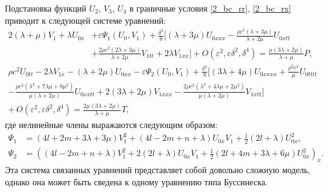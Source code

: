 \documentclass[12pt, a4paper]{article}
\begin{document}
Подстановка функций $ U_2 $, $ V_3 $, $ U_4 $ в граничные условия \eqref{2_bc_rr}, \eqref{2_bc_rx} приводит к следующей системе уравнений:
\begin{equation} \label{2_bc_rr_subst}
\begin{split}
2 (\lambda + \mu) V_1 + \lambda U_{0x} &+\varepsilon \Psi_1(U_0, V_1) + \frac{\delta^2}{8} \bigg[ (\lambda + 3\mu) U_{0xxx}- \frac{\rho c^2(\lambda + 3\mu)}{\lambda + 2\mu} U_{0xtt} \\
&+ \frac{2\rho c^2(2\lambda + 3\mu)}{\lambda + 2\mu} V_{1tt} + 2\lambda V_{1xx}\bigg] 
+ O(\varepsilon^2, \varepsilon\delta^2, \delta^4) =  \frac{\mu(3\lambda + 2\mu)}{\lambda + \mu} P,
\end{split}
\end{equation}
\begin{equation} \label{2_bc_rx_subst}
\begin{split}
\rho  c^2 U_{0tt} -2 \lambda  V_{1x}-(\lambda +2 \mu ) U_{0xx} - \varepsilon \Psi_2(U_0, V_1)
+ \frac{\delta^2}{8}\bigg[(3\lambda + 4\mu)U_{0xxxx} + \frac{\rho^2 c^4}{\mu}U_{0tttt}\\
- \frac{\rho c^2\left(\lambda^2 + 7\lambda\mu + 8\mu^2\right)}{\mu(\lambda + 2\mu)} U_{0xxtt} + 2(3\lambda + 2\mu)V_{1xxx} - \frac{2 \rho  c^2 \left(\lambda ^2+4 \lambda  \mu +2 \mu ^2\right)}{\mu(\lambda + 2\mu)} V_{1xtt} \bigg]\\
+\,O(\varepsilon^2, \varepsilon\delta^2, \delta^4)
= \frac{2\mu(3\lambda + 2\mu)}{\lambda + \mu} T,
\end{split}
\end{equation}
где нелинейные члены выражаются следующим образом: 
\begin{align}
	\nonumber
	\Psi_1 &= (4l + 2m + 3\lambda + 3\mu) V_1^2 + (4l - 2m + n + \lambda) U_{0x} V_1 + \frac{1}{2} (2l + \lambda) U_{0x}^2, \\
	\nonumber
	\Psi_2 &= \left((4l - 2m + n + \lambda) V_1^2 + 2(2l + \lambda) U_{0x} V_1 + \frac12(2l + 4m + 3\lambda + 6\mu) U_{0x}^2 \right)_x.
\end{align}
Эта система связанных уравнений представляет собой довольно сложную модель, однако она может быть сведена к одному уравнению типа Буссинеска.
\end{document}
